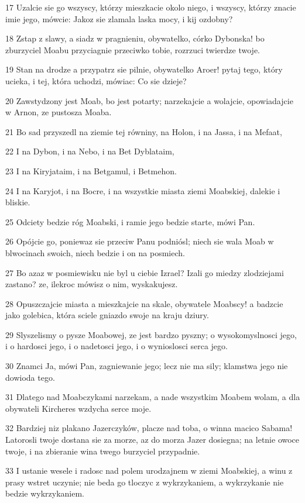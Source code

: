 \par 17 Uzalcie sie go wszyscy, którzy mieszkacie okolo niego, i wszyscy, którzy znacie imie jego, mówcie: Jakoz sie zlamala laska mocy, i kij ozdobny?
\par 18 Zstap z slawy, a siadz w pragnieniu, obywatelko, córko Dybonska! bo zburzyciel Moabu przyciagnie przeciwko tobie, rozrzuci twierdze twoje.
\par 19 Stan na drodze a przypatrz sie pilnie, obywatelko Aroer! pytaj tego, który ucieka, i tej, która uchodzi, mówiac: Co sie dzieje?
\par 20 Zawstydzony jest Moab, bo jest potarty; narzekajcie a wolajcie, opowiadajcie w Arnon, ze pustosza Moaba.
\par 21 Bo sad przyszedl na ziemie tej równiny, na Holon, i na Jassa, i na Mefaat,
\par 22 I na Dybon, i na Nebo, i na Bet Dyblataim,
\par 23 I na Kiryjataim, i na Betgamul, i Betmehon.
\par 24 I na Karyjot, i na Bocre, i na wszystkie miasta ziemi Moabskiej, dalekie i bliskie.
\par 25 Odciety bedzie róg Moabski, i ramie jego bedzie starte, mówi Pan.
\par 26 Opójcie go, poniewaz sie przeciw Panu podniósl; niech sie wala Moab w blwocinach swoich, niech bedzie i on na posmiech.
\par 27 Bo azaz w posmiewisku nie byl u ciebie Izrael? Izali go miedzy zlodziejami zastano? ze, ilekroc mówisz o nim, wyskakujesz.
\par 28 Opuszczajcie miasta a mieszkajcie na skale, obywatele Moabscy! a badzcie jako golebica, która sciele gniazdo swoje na kraju dziury.
\par 29 Slyszelismy o pysze Moabowej, ze jest bardzo pyszny; o wysokomyslnosci jego, i o hardosci jego, i o nadetosci jego, i o wynioslosci serca jego.
\par 30 Znamci Ja, mówi Pan, zagniewanie jego; lecz nie ma sily; klamstwa jego nie dowioda tego.
\par 31 Dlatego nad Moabczykami narzekam, a nade wszystkim Moabem wolam, a dla obywateli Kircheres wzdycha serce moje.
\par 32 Bardziej niz plakano Jazerczyków, placze nad toba, o winna macico Sabama! Latorosli twoje dostana sie za morze, az do morza Jazer dosiegna; na letnie owoce twoje, i na zbieranie wina twego burzyciel przypadnie.
\par 33 I ustanie wesele i radosc nad polem urodzajnem w ziemi Moabskiej, a winu z prasy wstret uczynie; nie beda go tloczyc z wykrzykaniem, a wykrzykanie nie bedzie wykrzykaniem.
